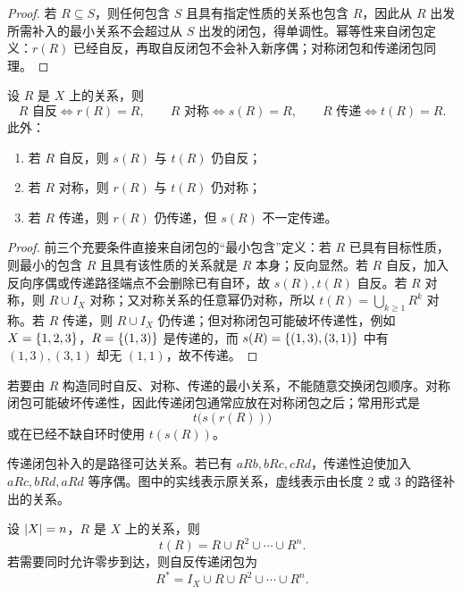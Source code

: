 \begin{proof}
若 $R\subseteq S$，则任何包含 $S$ 且具有指定性质的关系也包含 $R$，因此从 $R$ 出发所需补入的最小关系不会超过从 $S$ 出发的闭包，得单调性。幂等性来自闭包定义：$r(R)$ 已经自反，再取自反闭包不会补入新序偶；对称闭包和传递闭包同理。
\end{proof}

\begin{theorem}[闭包与原有性质]\label{ch2-closure-fixed-preserve}
设 $R$ 是 $X$ 上的关系，则
\[
R\text{ 自反}\Longleftrightarrow r(R)=R,\qquad
R\text{ 对称}\Longleftrightarrow s(R)=R,\qquad
R\text{ 传递}\Longleftrightarrow t(R)=R.
\]
此外：
\begin{enumerate}
  \item 若 $R$ 自反，则 $s(R)$ 与 $t(R)$ 仍自反；
  \item 若 $R$ 对称，则 $r(R)$ 与 $t(R)$ 仍对称；
  \item 若 $R$ 传递，则 $r(R)$ 仍传递，但 $s(R)$ 不一定传递。
\end{enumerate}
\end{theorem}

\begin{proof}
前三个充要条件直接来自闭包的“最小包含”定义：若 $R$ 已具有目标性质，则最小的包含 $R$ 且具有该性质的关系就是 $R$ 本身；反向显然。若 $R$ 自反，加入反向序偶或传递路径端点不会删除已有自环，故 $s(R),t(R)$ 自反。若 $R$ 对称，则 $R\cup I_X$ 对称；又对称关系的任意幂仍对称，所以 $t(R)=\bigcup_{k\ge1}R^k$ 对称。若 $R$ 传递，则 $R\cup I_X$ 仍传递；但对称闭包可能破坏传递性，例如 $X=\{1,2,3\}$，$R=\{(1,3)\}$ 是传递的，而 $s(R)=\{(1,3),(3,1)\}$ 中有 $(1,3),(3,1)$ 却无 $(1,1)$，故不传递。
\end{proof}

\begin{pitfall}[多个闭包同时要求时的顺序]\label{ch2-closure-order-pitfall}
若要由 $R$ 构造同时自反、对称、传递的最小关系，不能随意交换闭包顺序。对称闭包可能破坏传递性，因此传递闭包通常应放在对称闭包之后；常用形式是
\[
  t\bigl(s(r(R))\bigr)
\]
或在已经不缺自环时使用 $t(s(R))$。
\end{pitfall}


传递闭包补入的是路径可达关系。若已有 $aRb,bRc,cRd$，传递性迫使加入 $aRc,bRd,aRd$ 等序偶。图中的实线表示原关系，虚线表示由长度 $2$ 或 $3$ 的路径补出的关系。

\begin{theorem}[有限集上传递闭包的幂表示]\label{ch2-transitive-closure}
设 $\lvert X\rvert=n$，$R$ 是 $X$ 上的关系，则
\[
  t(R)=R\cup R^2\cup\cdots\cup R^n.
\]
若需要同时允许零步到达，则自反传递闭包为
\[
  R^*=I_X\cup R\cup R^2\cup\cdots\cup R^n.
\]
\end{theorem}

